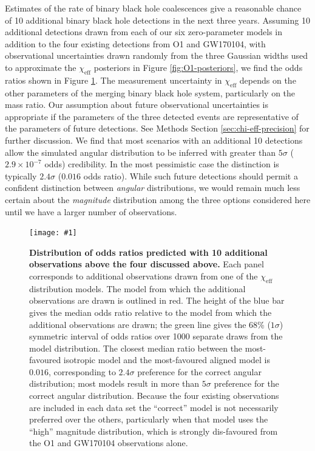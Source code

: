 \documentclass{nature-arxiv}
\newcommand{\chieff}{\chi_\mathrm{eff}}
\newcommand{\OTwoSigmaIsoAlignedMin}{2.4}
\newcommand{\OTwoOddsIsoAlignedMin}{0.016}
\newcommand{\plotone}[1]{\texttt{[image: \#1]}}
\begin{document}
Estimates of the rate of binary black hole coalescences give a
reasonable chance of 10 additional binary black hole detections in the
next three years\cite{O1-BBH,2016ApJ...833L...1A}.  Assuming 10
additional detections drawn from each of our six zero-parameter models
in addition to the four existing detections from O1 and GW170104, with
observational uncertainties drawn randomly from the three Gaussian
widths used to approximate the $\chieff$ posteriors in Figure
\ref{fig:O1-posteriors}, we find the odds ratios shown in Figure
\ref{fig:O2-predictions}.  The measurement uncertainty in $\chieff$
depends on the other parameters of the merging binary black hole
system, particularly on the mass ratio.  Our assumption about future
observational uncertainties is appropriate if the parameters of the
three detected events are representative of the parameters of future
detections. See Methods Section \ref{sec:chi-eff-precision} for
further discussion.  We find that most scenarios with an additional 10
detections allow the simulated angular distribution to be inferred
with greater than $5\sigma$ ($2.9 \times 10^{-7}$ odds)
credibility. In the most pessimistic case the distinction is typically
$\OTwoSigmaIsoAlignedMin\sigma$ ($\OTwoOddsIsoAlignedMin$ odds ratio).
While such future detections should permit a confident distinction
between \emph{angular} distributions, we would remain much less
certain about the \emph{magnitude} distribution among the three
options considered here until we have a larger number of observations.

\begin{figure}
  \plotone{../plots/six-way-O2-model-selection}
  \caption{\label{fig:O2-predictions} \textbf{Distribution of odds
      ratios predicted with 10 additional observations above the four
      discussed above.}  Each panel corresponds to additional
    observations drawn from one of the $\chieff$ distribution models.
    The model from which the additional observations are drawn is
    outlined in red.  The height of the blue bar gives the median odds
    ratio relative to the model from which the additional observations
    are drawn; the green line gives the 68\% ($1 \sigma$) symmetric
    interval of odds ratios over 1000 separate draws from the model
    distribution.  The closest median ratio between the most-favoured
    isotropic model and the most-favoured aligned model is
    $\OTwoOddsIsoAlignedMin$, corresponding to
    $\OTwoSigmaIsoAlignedMin\sigma$ preference for the correct angular
    distribution; most models result in more than $5\sigma$ preference
    for the correct angular distribution.  Because the four existing
    observations are included in each data set the ``correct'' model
    is not necessarily preferred over the others, particularly when
    that model uses the ``high'' magnitude distribution, which is
    strongly dis-favoured from the O1 and GW170104 observations
    alone.}
\end{figure}
\end{document}
